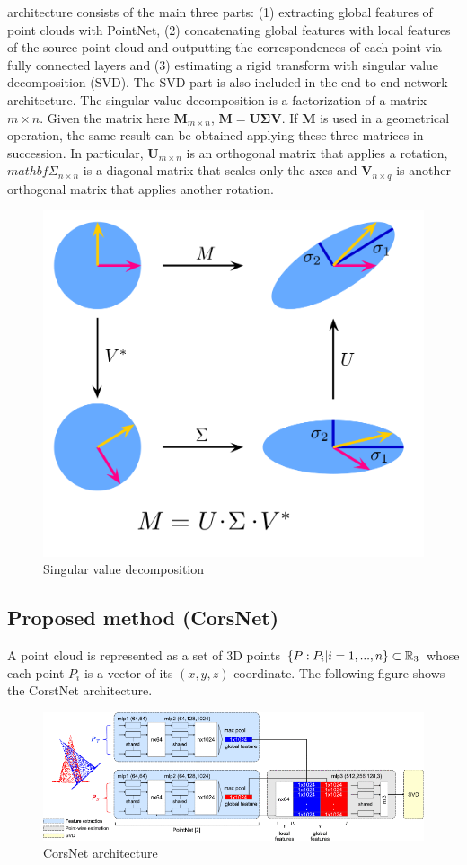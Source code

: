 architecture consists of the main three parts: (1) extracting global
features of point clouds with PointNet, (2) concatenating global
features with local features of the source point cloud and outputting
the correspondences of each point via fully connected layers and (3)
estimating a rigid transform with singular value decomposition (SVD).
The SVD part is also included in the end-to-end network architecture.
The singular value decomposition is a factorization of a matrix
$m \times n$. Given the matrix here $\mathbf {M}_{m\times n}$,
$\mathbf{M} = \mathbf{U}\mathbf{\Sigma}\mathbf{V}$. If $\mathbf {M}$ is used
in a geometrical operation, the same result can be obtained applying
these three matrices in succession. In particular,
$\mathbf {U}_{m\times n}$ is an orthogonal matrix that applies a
rotation, $mathbf{\Sigma}_{n\times n}$ is a diagonal matrix that scales only
the axes and $\mathbf {V}_{n\times q}$ is another orthogonal matrix
that applies another rotation.
\newpage
\begin{figure}[h!]
\centering
\includegraphics[width=0.7\linewidth]{images/singolarvaluedec.png}
\caption{Singular value decomposition}
\end{figure}

\subsection{Proposed method (CorsNet)}\label{header-n539}

A point cloud is represented as a set of 3D points
$\{P : P_i|i = 1, . . ., n\} \subset \mathbb{R}_3$ whose each point $P_i$ is
a vector of its $(x, y, z)$ coordinate. The following figure shows the
CorstNet architecture.

\begin{figure}[h!]
\centering
\includegraphics[width=0.8\linewidth]{images/corsnetarch.png}
\caption{CorsNet architecture}
\end{figure}

